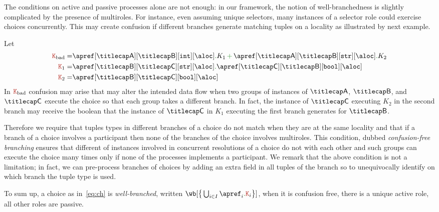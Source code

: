 The conditions on active and passive processes alone are not enough:
in our framework, the notion of well-branchedness is slightly
complicated by the presence of multiroles.
%
For instance, even assuming unique selectors, many instances of a
selector role could exercise choices concurrently.
%
This may create confusion if different branches generate matching
tuples on a locality as illustrated by next example.
\begin{example}\label{ex:nonwb}
  Let
  \begin{align*}
    \aK_\mathrm{bad} = & \apref[\amulti A][\amulti B][{\asort[int]}][\aloc] \mkop{.} K_1 \chop \apref[\amulti A][\amulti B][{\asort[str]}][\aloc] \mkop{.} K_2
    \\
    \aK_1 = & \apref[\amulti B][\amulti C][{\asort[str]}][\aloc] \mkop{.} \apref[\amulti C][\amulti B][{\asort[bool]}][\aloc]
    \\
    \aK_2 = & \apref[\amulti B][\amulti C][{\asort[bool]}][\aloc]
  \end{align*}
  In $\aK_\mathrm{bad}$ confusion may arise that may alter the
  intended data flow when two groups of instances of $\amulti A$,
  $\amulti B$, and $\amulti C$ execute the choice so that each group
  takes a different branch.
  In fact, the instance of $\amulti C$ executing $K_2$ in the second
  branch may receive the boolean that the instance of $\amulti C$ in
  $K_1$ executing the first branch generates for $\amulti B$.
  \finex
\end{example}
%
Therefore we require that tuples types in different branches of a
choice do not match when they are at the same locality and that if a
branch of a choice involves a participant then none of the branches of
the choice involves multiroles.
%
This condition, dubbed \emph{confusion-free branching} ensures that
different  of instances involved in concurrent resolutions
of a choice do not  with each other and such groups can
execute the choice many times only if none of the processes implements
a participant.
%
We remark that the above condition is not a limitation; in fact, we
can pre-process branches of choices by adding an extra field in all
tuples of the branch so to unequivocally identify on which branch the
tuple type is used.

To sum up, a choice as in~\eqref{eq:ch} is \emph{well-branched},
written $\wb[{\big\{\bigcup_{i \in I}\apref_i\mkop{.}\aK_i\big\}}]$,
when it is confusion free, there is a unique active role, all other
roles are passive.


